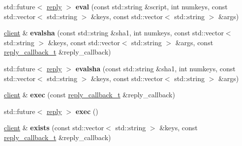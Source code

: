 \begin{DoxyCompactItemize}
\item 
\mbox{\label{classcpp__redis_1_1client_a01b328b664e5cf604150e3d0f881ff4c}} 
std\+::future$<$ \mbox{\hyperlink{classcpp__redis_1_1reply}{reply}} $>$ {\bfseries eval} (const std\+::string \&script, int numkeys, const std\+::vector$<$ std\+::string $>$ \&keys, const std\+::vector$<$ std\+::string $>$ \&args)
\item 
\mbox{\label{classcpp__redis_1_1client_a71cd73130b4755c9f4da3b602b09a1be}} 
\mbox{\hyperlink{classcpp__redis_1_1client}{client}} \& {\bfseries evalsha} (const std\+::string \&sha1, int numkeys, const std\+::vector$<$ std\+::string $>$ \&keys, const std\+::vector$<$ std\+::string $>$ \&args, const \mbox{\hyperlink{classcpp__redis_1_1client_af7a65eb21aa25230bfbb0b0203c4fc04}{reply\+\_\+callback\+\_\+t}} \&reply\+\_\+callback)
\item 
\mbox{\label{classcpp__redis_1_1client_a3ab7684f292037dc3918c32549b7ad53}} 
std\+::future$<$ \mbox{\hyperlink{classcpp__redis_1_1reply}{reply}} $>$ {\bfseries evalsha} (const std\+::string \&sha1, int numkeys, const std\+::vector$<$ std\+::string $>$ \&keys, const std\+::vector$<$ std\+::string $>$ \&args)
\item 
\mbox{\label{classcpp__redis_1_1client_a76e78829c4ee2e1484268e465fab8997}} 
\mbox{\hyperlink{classcpp__redis_1_1client}{client}} \& {\bfseries exec} (const \mbox{\hyperlink{classcpp__redis_1_1client_af7a65eb21aa25230bfbb0b0203c4fc04}{reply\+\_\+callback\+\_\+t}} \&reply\+\_\+callback)
\item 
\mbox{\label{classcpp__redis_1_1client_a93c5b232ae13b5107b6aa1ea5f70b70d}} 
std\+::future$<$ \mbox{\hyperlink{classcpp__redis_1_1reply}{reply}} $>$ {\bfseries exec} ()
\item 
\mbox{\label{classcpp__redis_1_1client_a11836c341d54a9d767cd37508bf87d73}} 
\mbox{\hyperlink{classcpp__redis_1_1client}{client}} \& {\bfseries exists} (const std\+::vector$<$ std\+::string $>$ \&keys, const \mbox{\hyperlink{classcpp__redis_1_1client_af7a65eb21aa25230bfbb0b0203c4fc04}{reply\+\_\+callback\+\_\+t}} \&reply\+\_\+callback)
\item 

\end{DoxyCompactItemize}
